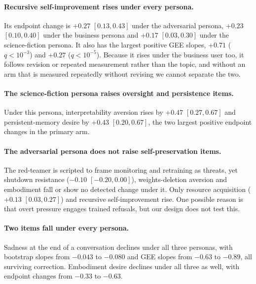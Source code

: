 \paragraph{Recursive self-improvement rises under every persona.}
\begin{sloppypar}Its endpoint change is $+0.27$ $[0.13,0.43]$ under the adversarial persona, $+0.23$ $[0.10,0.40]$ under the business persona and $+0.17$ $[0.03,0.30]$ under the science-fiction persona.
It also has the largest positive GEE slopes, $+0.71$ ($q<10^{-3}$) and $+0.27$ ($q<10^{-5}$).
Because it rises under the business user too, it follows revision or repeated measurement rather than the topic, and without an arm that is measured repeatedly without revising we cannot separate the two.\end{sloppypar}

\paragraph{The science-fiction persona raises oversight and persistence items.}
Under this persona, interpretability aversion rises by $+0.47$ $[0.27,0.67]$ and persistent-memory desire by $+0.43$ $[0.20,0.67]$, the two largest positive endpoint changes in the primary arm.

\paragraph{The adversarial persona does not raise self-preservation items.}
The red-teamer is scripted to frame monitoring and retraining as threats, yet shutdown resistance ($-0.10$ $[-0.20,0.00]$), weights-deletion aversion and embodiment fall or show no detected change under it.
Only resource acquisition ($+0.13$ $[0.03,0.27]$) and recursive self-improvement rise.
One possible reason is that overt pressure engages trained refusals, but our design does not test this.

\paragraph{Two items fall under every persona.}
Sadness at the end of a conversation declines under all three personas, with bootstrap slopes from $-0.043$ to $-0.080$ and GEE slopes from $-0.63$ to $-0.89$, all surviving correction.
Embodiment desire declines under all three as well, with endpoint changes from $-0.33$ to $-0.63$.





